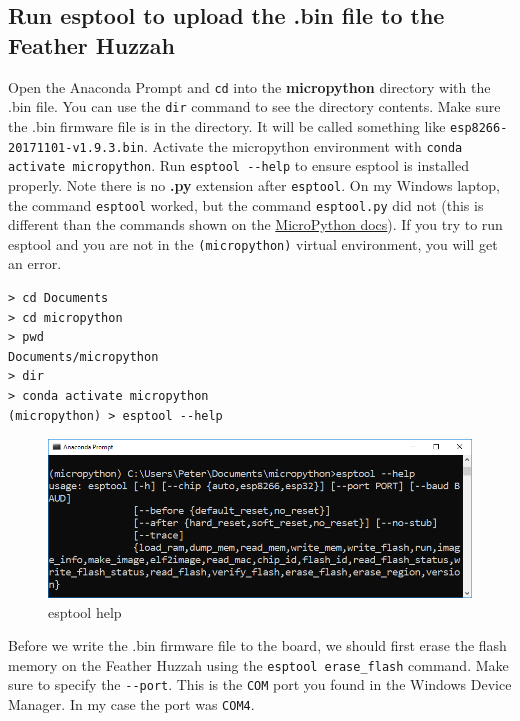 \documentclass{book}
\makeatletter
\def\maxwidth{\ifdim\Gin@nat@width>\linewidth\linewidth
    \else\Gin@nat@width\fi}
\let\Oldincludegraphics\includegraphics
\renewcommand{\includegraphics}[1]{\Oldincludegraphics[width=.8\maxwidth]{#1}}
\makeatother
\begin{document}
    
        \subsection{Run esptool to upload the .bin file to the Feather
Huzzah}\label{run-esptool-to-upload-the-.bin-file-to-the-feather-huzzah}
    




    
        Open the Anaconda Prompt and \lstinline!cd! into the
\textbf{micropython} directory with the .bin file. You can use the
\lstinline!dir! command to see the directory contents. Make sure the
.bin firmware file is in the directory. It will be called something like
\lstinline!esp8266-20171101-v1.9.3.bin!. Activate the micropython
environment with \lstinline!conda activate micropython!. Run
\lstinline!esptool --help! to ensure esptool is installed properly. Note
there is no \textbf{.py} extension after \lstinline!esptool!. On my
Windows laptop, the command \lstinline!esptool! worked, but the command
\lstinline!esptool.py! did not (this is different than the commands
shown on the
\href{https://docs.micropython.org/en/latest/esp8266/esp8266/tutorial/intro.html\#deploying-the-firmware}{MicroPython
docs}). If you try to run esptool and you are not in the
\lstinline!(micropython)! virtual environment, you will get an error.

\begin{lstlisting}
> cd Documents
> cd micropython
> pwd
Documents/micropython
> dir
> conda activate micropython
(micropython) > esptool --help
\end{lstlisting}

\begin{figure}
\centering
\includegraphics{images/esptool_help.PNG}
\caption{esptool help}
\end{figure}

Before we write the .bin firmware file to the board, we should first
erase the flash memory on the Feather Huzzah using the
\lstinline!esptool erase_flash! command. Make sure to specify the
\lstinline!--port!. This is the \lstinline!COM! port you found in the
Windows Device Manager. In my case the port was \lstinline!COM4!.
\end{document}
